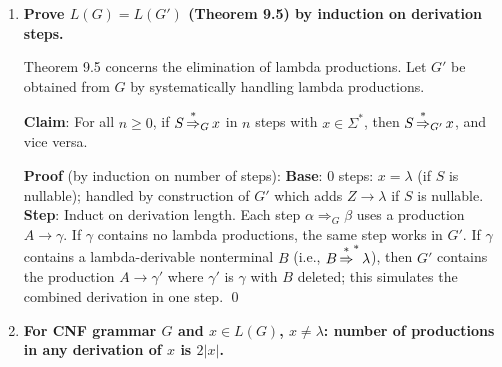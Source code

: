 \begin{enumerate}[{9.}1. ]
\begin{enumerate}
\item \textbf{Rightmost derivation} (always expand rightmost nonterminal):
\begin{align*}
R &\Rightarrow \pmb{(}R\pmb{\cup}R\pmb{)} \\
&\Rightarrow \pmb{(}R\pmb{\cup}\pmb{(}R\pmb{\cdot}R\pmb{)}^{\pmb{*}}\pmb{)} \\
&\Rightarrow \pmb{(}R\pmb{\cup(}R\pmb{\cdot}\pmb{d}\pmb{)}^{\pmb{*}}\pmb{)} \\
&\Rightarrow \pmb{(}R\pmb{\cup(}\pmb{c}\pmb{\cdot d)}^{\pmb{*}}\pmb{)} \\
&\Rightarrow \pmb{(}\pmb{(}R\pmb{\cdot}R\pmb{)}\pmb{\cup(c\cdot d)}^{\pmb{*}}\pmb{)} \\
&\Rightarrow \pmb{((}R\pmb{\cdot}\pmb{b}\pmb{)\cup(c\cdot d)}^{\pmb{*}}\pmb{)} \\
&\Rightarrow \pmb{((}R^{\pmb{*}}\pmb{\cdot b)\cup(c\cdot d)}^{\pmb{*}}\pmb{)} \\
&\Rightarrow \pmb{((a^*\cdot b)\cup(c\cdot d)}^{\pmb{*}}\pmb{)}
\end{align*}
\end{enumerate}

\item \textbf{Prove $L(G) = L(G')$ (Theorem 9.5) by induction on derivation steps.}

Theorem 9.5 concerns the elimination of lambda productions. Let $G'$ be obtained from $G$ by systematically handling lambda productions.

\textbf{Claim}: For all $n \geq 0$, if $S \operatorname{\overset{*}{\Rightarrow}}_G x$ in $n$ steps with $x \in \Sigma^*$, then $S \operatorname{\overset{*}{\Rightarrow}}_{G'} x$, and vice versa.

\textbf{Proof} (by induction on number of steps):
\textbf{Base}: 0 steps: $x = \lambda$ (if $S$ is nullable); handled by construction of $G'$ which adds $Z \to \lambda$ if $S$ is nullable.
\textbf{Step}: Induct on derivation length. Each step $\alpha \Rightarrow_G \beta$ uses a production $A \to \gamma$. If $\gamma$ contains no lambda productions, the same step works in $G'$. If $\gamma$ contains a lambda-derivable nonterminal $B$ (i.e., $B \operatorname{\overset{*}{\Rightarrow}}^* \lambda$), then $G'$ contains the production $A \to \gamma'$ where $\gamma'$ is $\gamma$ with $B$ deleted; this simulates the combined derivation in one step. \qed

\item \textbf{For CNF grammar $G$ and $x \in L(G)$, $x \neq \lambda$: number of productions in any derivation of $x$ is $2|x|$.}


\end{enumerate}
